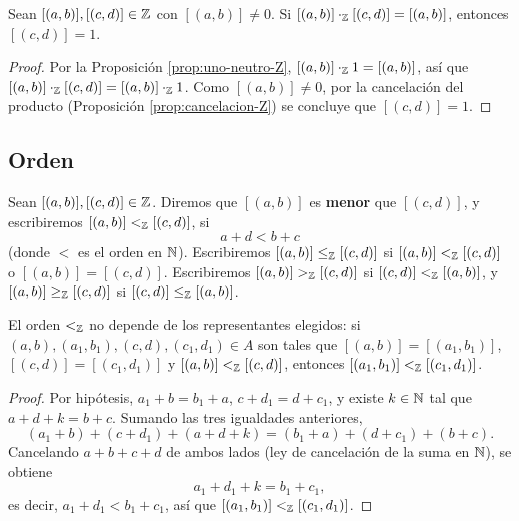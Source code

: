 \documentclass[12pt,a4paper]{book}
\begin{document}
    \begin{corolario}
        \label{coro:uno-unico-Z}
        Sean $[(a,b)],[(c,d)]\in\mathbb{Z}$ con $[(a,b)]\neq0$. Si $[(a,b)]\cdot_{\mathbb{Z}}[(c,d)]=[(a,b)]$, entonces $[(c,d)]=1$.
    \end{corolario}
    \begin{proof}
        Por la Proposición \ref{prop:uno-neutro-Z}, $[(a,b)]\cdot_{\mathbb{Z}}1=[(a,b)]$, así que $[(a,b)]\cdot_{\mathbb{Z}}[(c,d)] = [(a,b)]\cdot_{\mathbb{Z}}1$. Como $[(a,b)]\neq0$, por la cancelación del producto (Proposición \ref{prop:cancelacion-Z}) se concluye que $[(c,d)]=1$.
    \end{proof}

    \subsection{Orden}

    \begin{definicion}[Orden en $\Z$]
        \label{def:orden-Z}
        Sean $[(a,b)],[(c,d)]\in\mathbb{Z}$. Diremos que $[(a,b)]$ es \textbf{menor} que $[(c,d)]$, y escribiremos $[(a,b)]<_{\mathbb{Z}}[(c,d)]$, si
        \begin{equation*}
            a+d < b+c
        \end{equation*}
        (donde $<$ es el orden en $\mathbb{N}$). Escribiremos $[(a,b)]\le_{\mathbb{Z}}[(c,d)]$ si $[(a,b)]<_{\mathbb{Z}}[(c,d)]$ o $[(a,b)]=[(c,d)]$. Escribiremos $[(a,b)]>_{\mathbb{Z}}[(c,d)]$ si $[(c,d)]<_{\mathbb{Z}}[(a,b)]$, y $[(a,b)]\ge_{\mathbb{Z}}[(c,d)]$ si $[(c,d)]\le_{\mathbb{Z}}[(a,b)]$.
    \end{definicion}

    \begin{proposicion}
        \label{prop:orden-Z-bien-definido}
        El orden $<_{\mathbb{Z}}$ no depende de los representantes elegidos: si $(a,b),(a_{1},b_{1}),(c,d),(c_{1},d_{1})\in A$ son tales que $[(a,b)]=[(a_{1},b_{1})]$, $[(c,d)]=[(c_{1},d_{1})]$ y $[(a,b)]<_{\mathbb{Z}}[(c,d)]$, entonces $[(a_{1},b_{1})]<_{\mathbb{Z}}[(c_{1},d_{1})]$.
    \end{proposicion}
    \begin{proof}
        Por hipótesis, $a_{1}+b=b_{1}+a$, $c+d_{1}=d+c_{1}$, y existe $k\in\mathbb{N}$ tal que $a+d+k=b+c$. Sumando las tres igualdades anteriores,
        \begin{equation*}
            (a_{1}+b)+(c+d_{1})+(a+d+k) = (b_{1}+a)+(d+c_{1})+(b+c).
        \end{equation*}
        Cancelando $a+b+c+d$ de ambos lados (ley de cancelación de la suma en $\mathbb{N}$), se obtiene
        \begin{equation*}
            a_{1}+d_{1}+k = b_{1}+c_{1},
        \end{equation*}
        es decir, $a_{1}+d_{1}<b_{1}+c_{1}$, así que $[(a_{1},b_{1})]<_{\mathbb{Z}}[(c_{1},d_{1})]$.
    \end{proof}
\end{document}
